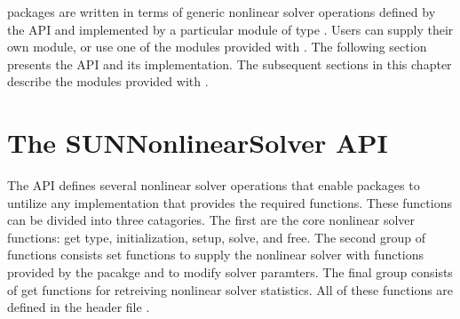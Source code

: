 {\sundials} packages are written in terms of generic nonlinear solver
operations defined by the {\sunnonlinsol} API and implemented by a
particular {\sunnonlinsol} module of type .
Users can supply their own {\sunnonlinsol} module, or use one of the
modules provided with {\sundials}. The following section presents the
{\sunnonlinsol} API and its implementation. The subsequent sections in
this chapter describe the {\sunnonlinsol} modules provided with
{\sundials}.


\section{The SUNNonlinearSolver API}
\label{s:sunnonlinsol_api}

The {\sunnonlinsol} API defines several nonlinear solver operations
that enable {\sundials} packages to untilize any {\sunnonlinsol}
implementation that provides the required functions. These functions
can be divided into three catagories. The first are the core nonlinear
solver functions: get type, initialization, setup, solve, and free.
The second group of functions consists set functions to supply the
nonlinear solver with functions provided by the {\sundials} pacakge
and to modify solver paramters. The final group consists of get
functions for retreiving nonlinear solver statistics. All of these
functions are defined in the header
file .

